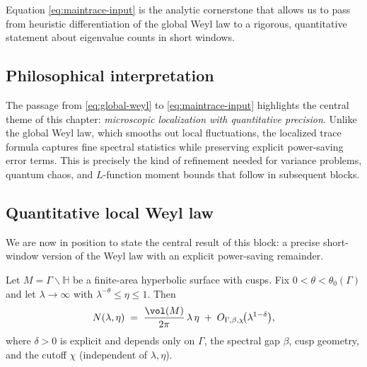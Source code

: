 Equation \eqref{eq:maintrace-input} is the analytic cornerstone that allows us to pass from heuristic differentiation of the global Weyl law to a rigorous, quantitative statement about eigenvalue counts in short windows.

\subsection{Philosophical interpretation}

The passage from \eqref{eq:global-weyl} to \eqref{eq:maintrace-input} highlights the central theme of this chapter: \emph{microscopic localization with quantitative precision}. Unlike the global Weyl law, which smooths out local fluctuations, the localized trace formula captures fine spectral statistics while preserving explicit power-saving error terms. This is precisely the kind of refinement needed for variance problems, quantum chaos, and $L$-function moment bounds that follow in subsequent blocks.


\subsection{Quantitative local Weyl law}

We are now in position to state the central result of this block: a precise short-window version of the Weyl law with an explicit power-saving remainder.

\begin{theorem}\label{thm:localweyl}
Let $M=\Gamma\backslash\mathbb{H}$ be a finite-area hyperbolic surface with cusps. Fix $0<\theta<\theta_0(\Gamma)$ and let $\lambda\to\infty$ with $\lambda^{-\theta}\le \eta \le 1$. Then
\begin{equation}\label{eq:local-weyl-main}
N(\lambda,\eta)
\;=\;\frac{\vol(M)}{2\pi}\,\lambda\,\eta \;+\; O_{\Gamma,\beta,\chi}\!\big(\lambda^{1-\delta}\big),
\end{equation}
where $\delta>0$ is explicit and depends only on $\Gamma$, the spectral gap $\beta$, cusp geometry, and the cutoff $\chi$ (independent of $\lambda,\eta$).
\end{theorem}

